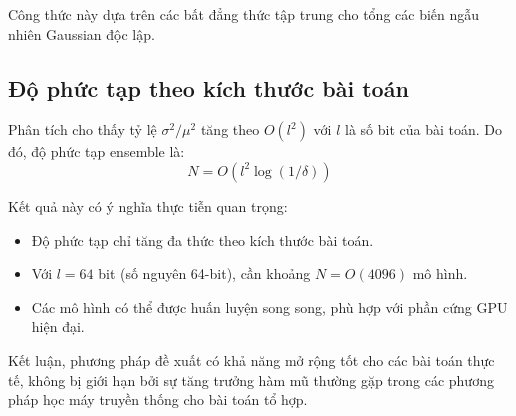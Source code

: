 Công thức này dựa trên các bất đẳng thức tập trung cho tổng các biến ngẫu nhiên Gaussian độc lập.

\subsection{Độ phức tạp theo kích thước bài toán}

Phân tích cho thấy tỷ lệ $\sigma^2/\mu^2$ tăng theo $O(l^2)$ với $l$ là số bit của bài toán. Do đó, độ phức tạp ensemble là:
\begin{equation}
    N = O(l^2 \log(1/\delta))
\end{equation}

Kết quả này có ý nghĩa thực tiễn quan trọng:
\begin{itemize}
    \item Độ phức tạp chỉ tăng đa thức theo kích thước bài toán.
    \item Với $l = 64$ bit (số nguyên 64-bit), cần khoảng $N = O(4096)$ mô hình.
    \item Các mô hình có thể được huấn luyện song song, phù hợp với phần cứng GPU hiện đại.
\end{itemize}

Kết luận, phương pháp đề xuất có khả năng mở rộng tốt cho các bài toán thực tế, không bị giới hạn bởi sự tăng trưởng hàm mũ thường gặp trong các phương pháp học máy truyền thống cho bài toán tổ hợp.
